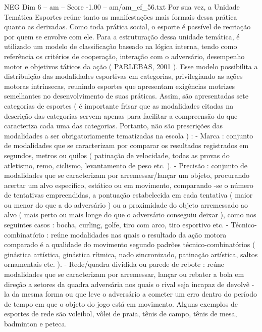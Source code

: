 \begin{textsample}{NEG Dim 6 – am – Score -1.00 – am/am\_ef\_56.txt}
Por sua vez, a Unidade Temática Esportes reúne tanto as manifestações mais formais dessa prática quanto as derivadas.
Como toda prática social, o esporte é passível de recriação por quem se envolve com ele.
Para a estruturação dessa unidade temática, é utilizado um modelo de classificação baseado na lógica interna, tendo como referência os critérios de cooperação, interação com o adversário, desempenho motor e objetivos táticos da ação ( PARLEBAS, 2001 ).
Esse modelo possibilita a distribuição das modalidades esportivas em categorias, privilegiando as ações motoras intrínsecas, reunindo esportes que apresentam exigências motrizes semelhantes no desenvolvimento de suas práticas.
Assim, são apresentadas sete categorias de esportes ( é importante frisar que as modalidades citadas na descrição das categorias servem apenas para facilitar a compreensão do que caracteriza cada uma das categorias.
Portanto, não são prescrições das modalidades a ser obrigatoriamente tematizadas na escola ) : - Marca : conjunto de modalidades que se caracterizam por comparar os resultados registrados em segundos, metros ou quilos ( patinação de velocidade, todas as provas do atletismo, remo, ciclismo, levantamento de peso etc. ). - Precisão : conjunto de modalidades que se caracterizam por arremessar/lançar um objeto, procurando acertar um alvo específico, estático ou em movimento, comparando -se o número de tentativas empreendidas, a pontuação estabelecida em cada tentativa ( maior ou menor do que a do adversário ) ou a proximidade do objeto arremessado ao alvo ( mais perto ou mais longe do que o adversário conseguiu deixar ), como nos seguintes casos : bocha, curling, golfe, tiro com arco, tiro esportivo etc. - Técnico-combinatório : reúne modalidades nas quais o resultado da ação motora comparado é a qualidade do movimento segundo padrões técnico-combinatórios ( ginástica artística, ginástica rítmica, nado sincronizado, patinação artística, saltos ornamentais etc. ). - Rede/quadra dividida ou parede de rebote : reúne modalidades que se caracterizam por arremessar, lançar ou rebater a bola em direção a setores da quadra adversária nos quais o rival seja incapaz de devolvê -la da mesma forma ou que leve o adversário a cometer um erro dentro do período de tempo em que o objeto do jogo está em movimento.
Alguns exemplos de esportes de rede são voleibol, vôlei de praia, tênis de campo, tênis de mesa, badminton e peteca.

\end{textsample}
